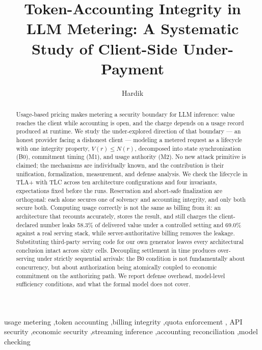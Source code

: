 \documentclass[preprint,3p,authoryear,12pt]{elsarticle}
\begin{document}
\begin{frontmatter}

\title{Token-Accounting Integrity in LLM Metering: A Systematic Study of Client-Side
Under-Payment}

\author[iitp,vips]{Hardik}
\address[iitp]{Department of Computer Science and Data Analytics, Indian Institute of
Technology Patna, India}
\address[vips]{Vivekananda School of Engineering and Technology, Vivekananda Institute
of Professional Studies --- Technical Campus, New Delhi, India}

\begin{abstract}
Usage-based pricing makes metering a security boundary for LLM inference: value reaches
the client while accounting is open, and the charge depends on a usage record produced
at runtime. We study the under-explored direction of that boundary --- an honest
provider facing a dishonest client --- modeling a metered request as a lifecycle with
one integrity property, $V(r) \le N(r)$, decomposed into state synchronization (B0),
commitment timing (M1), and usage authority (M2). No new attack primitive is claimed; the
mechanisms are individually known, and the contribution is their unification,
formalization, measurement, and defense analysis. We check the lifecycle in TLA+ with TLC
across ten architecture configurations and four invariants, expectations fixed before the
runs. Reservation and abort-safe finalization are orthogonal: each alone secures one of
solvency and accounting integrity, and only both secure both. Computing usage correctly
is not the same as billing from it: an architecture that recounts accurately, stores the
result, and still charges the client-declared number leaks 58.3\% of delivered value
under a controlled setting and 69.0\% against a real serving stack, while
server-authoritative billing removes the leakage. Substituting third-party serving code
for our own generator leaves every architectural conclusion intact across sixty cells.
Decoupling settlement in time produces over-serving under strictly sequential arrivals:
the B0 condition is not fundamentally about concurrency, but about authorization being
atomically coupled to economic commitment on the authorizing path. We report defense
overhead, model-level sufficiency conditions, and what the formal model does not cover.
\end{abstract}

\begin{keyword}
usage metering \sep token accounting \sep billing integrity \sep quota enforcement \sep
API security \sep economic security \sep streaming inference \sep accounting
reconciliation \sep model checking
\end{keyword}

\end{frontmatter}
\end{document}
